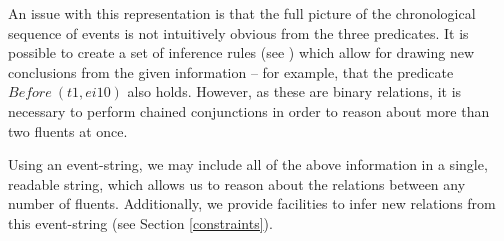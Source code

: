 \documentclass[a4paper,11pt,leqno]{article}
\begin{document}
An issue with this representation is that the full picture of the  
chronological sequence of events is not intuitively obvious from the three 
predicates. It is possible to create a set of inference rules (see 
\citealp{setzer2005role}) which allow for drawing new conclusions from the 
given information -- for example, that the predicate $Before~(t1, ei10)$ also 
holds. However, as these are binary relations, it is necessary to perform 
chained conjunctions in order to reason about more than two fluents at once.
 
Using an event-string, we may include all of the above information in a single, 
readable string, which allows us to reason about the relations between any 
number of fluents. Additionally, we provide facilities to infer new relations 
from this event-string (see Section \ref{constraints}).
\end{document}
